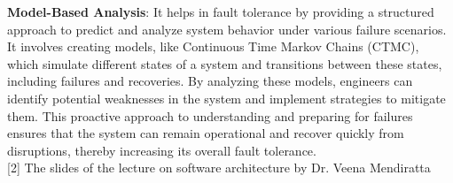 \documentclass[12pt]{article}
\numberwithin{table}{section}
\begin{document}
	\textbf{Model-Based Analysis}: It helps in fault tolerance by providing a structured approach to predict and analyze system behavior under various failure scenarios. It involves creating models, like Continuous Time Markov Chains (CTMC), which simulate different states of a system and transitions between these states, including failures and recoveries. By analyzing these models, engineers can identify potential weaknesses in the system and implement strategies to mitigate them. This proactive approach to understanding and preparing for failures ensures that the system can remain operational and recover quickly from disruptions, thereby increasing its overall fault tolerance.\\
	
	{\small [2] The slides of the lecture on software architecture by Dr. Veena Mendiratta}
\end{document}
